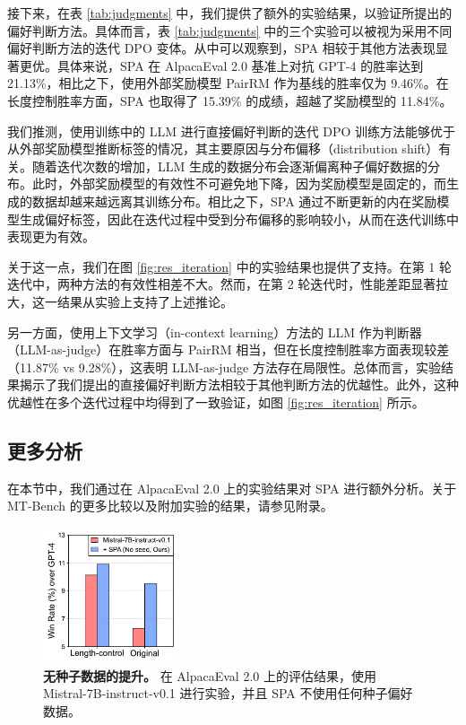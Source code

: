 接下来，在表 \ref{tab:judgments} 中，我们提供了额外的实验结果，以验证所提出的偏好判断方法。具体而言，表 \ref{tab:judgments} 中的三个实验可以被视为采用不同偏好判断方法的迭代 DPO 变体。从中可以观察到，SPA 相较于其他方法表现显著更优。具体来说，SPA 在 AlpacaEval 2.0 基准上对抗 GPT-4 的胜率达到 21.13\%，相比之下，使用外部奖励模型 PairRM 作为基线的胜率仅为 9.46\%。在长度控制胜率方面，SPA 也取得了 15.39\% 的成绩，超越了奖励模型的 11.84\%。 

我们推测，使用训练中的 LLM 进行直接偏好判断的迭代 DPO 训练方法能够优于从外部奖励模型推断标签的情况，其主要原因与分布偏移（distribution shift）有关。随着迭代次数的增加，LLM 生成的数据分布会逐渐偏离种子偏好数据的分布。此时，外部奖励模型的有效性不可避免地下降，因为奖励模型是固定的，而生成的数据却越来越远离其训练分布。相比之下，SPA 通过不断更新的内在奖励模型生成偏好标签，因此在迭代过程中受到分布偏移的影响较小，从而在迭代训练中表现更为有效。

关于这一点，我们在图 \ref{fig:res_iteration} 中的实验结果也提供了支持。在第 1 轮迭代中，两种方法的有效性相差不大。然而，在第 2 轮迭代时，性能差距显著拉大，这一结果从实验上支持了上述推论。

另一方面，使用上下文学习（in-context learning）方法的 LLM 作为判断器（LLM-as-judge）在胜率方面与 PairRM 相当，但在长度控制胜率方面表现较差（11.87\% vs 9.28\%），这表明 LLM-as-judge 方法存在局限性。总体而言，实验结果揭示了我们提出的直接偏好判断方法相较于其他判断方法的优越性。此外，这种优越性在多个迭代过程中均得到了一致验证，如图 \ref{fig:res_iteration} 所示。

\subsection{更多分析}\label{sec:5.3}

在本节中，我们通过在 AlpacaEval 2.0 上的实验结果对 SPA 进行额外分析。关于 MT-Bench 的更多比较以及附加实验的结果，请参见附录。

\begin{figure}[t]
    \centering
        \includegraphics[width=40mm]{figure/raw_files/spa_fig4.pdf}
        \caption{\textbf{无种子数据的提升。} 在 AlpacaEval 2.0 上的评估结果，使用 Mistral-7B-instruct-v0.1 进行实验，并且 SPA 不使用任何种子偏好数据。}
 \label{fig:res_no_seed}
\end{figure}

